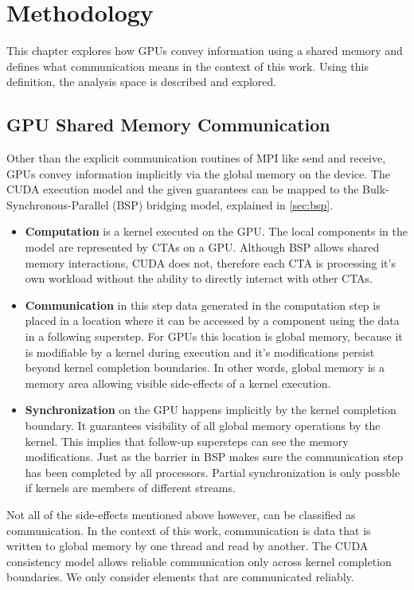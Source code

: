 \chapter{Methodology}\label{methodik}
This chapter explores how GPUs convey information using a shared memory and defines what communication means in the context of this work. Using this definition, the analysis space is described and explored.
\section{GPU Shared Memory Communication}
Other than the explicit communication routines of MPI like send and receive, GPUs convey information implicitly via the global memory on the device. 
The CUDA execution model and the given guarantees can be mapped to the Bulk-Synchronous-Parallel (BSP) bridging model, explained in \ref{sec:bsp}.
\begin{itemize}
	\item \textbf{Computation} is a kernel executed on the GPU. The local components in the model are represented by CTAs on a GPU. Although BSP allows shared memory interactions, CUDA does not, therefore  each CTA is processing it's own workload without the ability to directly interact with other CTAs. 
	\item \textbf{Communication} in this step data generated in the computation step is placed in a location where it can be accessed by a component using the data in a following superstep. For GPUs this location is 
	global memory, because it is modifiable by a kernel during execution and it's modifications persist beyond kernel completion boundaries. In other words, global memory is a memory area allowing visible side-effects
	of a kernel execution.
	\item \textbf{Synchronization} on the GPU happens implicitly by the kernel completion boundary. It guarantees visibility of all global memory operations by the kernel. This implies that follow-up supersteps can see the memory modifications. Just as the barrier in BSP makes sure the communication step
	has been completed by all processors. Partial synchronization is only possble if kernels are members of different streams.
\end{itemize} 
 Not all of the side-effects mentioned above however, can be classified as communication. In the context of this work, communication is data that is written to global memory by one thread and read by another. The CUDA consistency model allows reliable communication only across kernel completion boundaries. We only consider elements that are communicated reliably.

